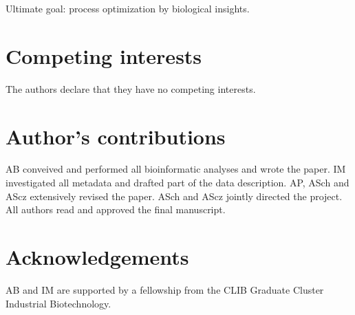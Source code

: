 \documentclass{bmcart}
\begin{document}
Ultimate goal: process optimization by biological insights.


\begin{backmatter}

\section*{Competing interests}
The authors declare that they have no competing interests.

\section*{Author's contributions}
AB conveived and performed all bioinformatic analyses and wrote the paper.
IM investigated all metadata and drafted part of the data description.
AP, ASch and AScz extensively revised the paper.
ASch and AScz jointly directed the project.
All authors read and approved the final manuscript.

\section*{Acknowledgements}
AB and IM are supported by a fellowship from the CLIB Graduate Cluster Industrial Biotechnology.




\end{backmatter}
\end{document}
